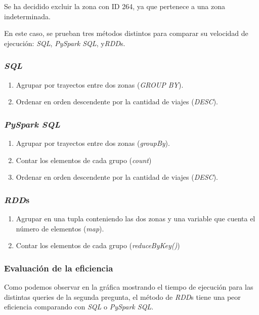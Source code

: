 Se ha decidido excluir la zona con ID 264, ya que pertenece a una zona indeterminada.

En este caso, se prueban tres métodos distintos para comparar su velocidad de ejecución: \textit{SQL}, \textit{ PySpark SQL}, y\textit{RDD}s.


\subsubsection*{\textit{SQL}}
\begin{enumerate}
  \item Agrupar por trayectos entre dos zonas (\textit{GROUP BY}).
  \item Ordenar en orden descendente por la cantidad de viajes (\textit{DESC}).
\end{enumerate}


\subsubsection*{\textit{PySpark SQL}}
\begin{enumerate}
  \item Agrupar por trayectos entre dos zonas (\textit{groupBy}).
  \item Contar los elementos de cada grupo (\textit{count})
  \item Ordenar en orden descendente por la cantidad de viajes (\textit{DESC}).
\end{enumerate}


\subsubsection*{\textit{RDD}s}
\begin{enumerate}
  \item Agrupar en una tupla conteniendo las dos zonas y una variable que cuenta el número de elementos (\textit{map}).
  \item Contar los elementos de cada grupo (\textit{reduceByKey()})
\end{enumerate}


\subsubsection*{Evaluación de la eficiencia}
Como podemos observar en la gráfica mostrando el tiempo de ejecución para las distintas queries de la segunda pregunta, el método de \textit{RDD}s tiene una peor eficiencia comparando con \textit{SQL} o \textit{PySpark SQL}.

